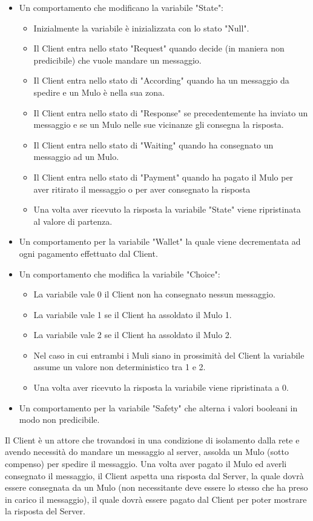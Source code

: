 \documentclass[13pt,a4paper]{article}
\begin{document}
\begin{itemize}
\begin{itemize}
		\item Un comportamento che modificano la variabile "State":
		\begin{itemize}
			\item Inizialmente la variabile è inizializzata con lo stato "Null".
			\item Il Client entra nello stato "Request" quando decide (in maniera non predicibile) che vuole mandare un messaggio.
			\item Il Client entra nello stato di "According" quando ha un messaggio da spedire e un Mulo è nella sua zona.
			\item Il Client entra nello stato di "Response" se precedentemente ha inviato un messaggio e se un Mulo nelle sue vicinanze gli consegna la risposta.
			\item Il Client entra nello stato di "Waiting" quando ha consegnato un messaggio ad un Mulo. 
			\item Il Client entra nello stato di "Payment" quando ha pagato il Mulo per aver ritirato il messaggio o per aver consegnato la risposta
			\item Una volta aver ricevuto la risposta la variabile "State" viene ripristinata al valore di partenza.
		\end{itemize}
		\item Un comportamento per la variabile "Wallet" la quale viene decrementata ad ogni pagamento effettuato dal Client.
		\item Un comportamento che modifica la variabile "Choice":
		\begin{itemize}
			\item La variabile vale 0 il Client non ha consegnato nessun messaggio.
			\item La variabile vale 1 se  il Client ha assoldato il Mulo 1.
			\item La variabile vale 2 se  il Client ha assoldato il Mulo 2.
			\item Nel caso in cui entrambi i Muli siano in prossimità del Client la variabile assume un valore non deterministico tra 1 e 2.
			\item Una volta aver ricevuto la risposta la variabile viene ripristinata a 0.
		\end{itemize}
	\item Un comportamento per la variabile "Safety" che alterna i valori  booleani in modo non predicibile.
	\end{itemize}
	Il Client  è un attore che trovandosi in una condizione di isolamento dalla rete e avendo necessità do mandare un messaggio al server, assolda un Mulo (sotto compenso) per spedire il messaggio. Una volta aver pagato il Mulo ed averli consegnato il messaggio, il Client aspetta una risposta dal Server, la quale dovrà essere consegnata da un Mulo (non necessitante deve essere lo stesso che ha preso in carico il messaggio), il quale dovrà essere pagato dal Client per poter mostrare la risposta del Server.
	

\end{itemize}
\end{document}
